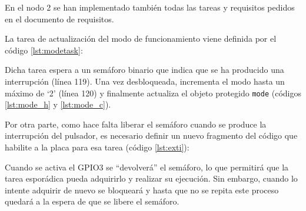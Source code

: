 En el nodo 2 se han implementado también todas las tareas y requisitos pedidos
en el documento de requisitos.

La tarea de actualización del modo de funcionamiento viene definida por el código
\ref{lst:modetask}:



Dicha tarea espera a un semáforo binario que indica que se ha producido una interrupción
(línea 119). Una vez desbloqueada, incrementa el modo hasta un máximo de `2' (línea 120)
y finalmente actualiza el objeto protegido \texttt{mode} (códigos \ref{lst:mode_h} y
\ref{lst:mode_c}).

Por otra parte, como hace falta liberar el semáforo cuando se produce la interrupción
del pulsador, es necesario definir un nuevo fragmento del código que habilite a la
placa para esa tarea (código \ref{lst:exti}):



Cuando se activa el GPIO3 se ``devolverá'' el semáforo, lo que permitirá que la tarea
esporádica pueda adquirirlo y realizar su ejecución. Sin embargo, cuando lo intente
adquirir de nuevo se bloqueará y hasta que no se repita este proceso quedará a la
espera de que se libere el semáforo.
